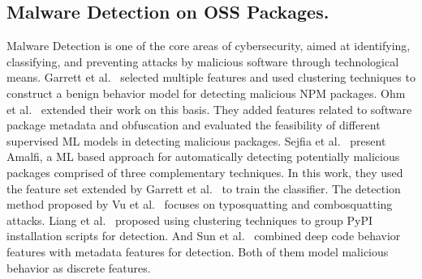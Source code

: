 \subsection{Malware Detection on OSS Packages.} 
Malware Detection is one of the core areas of cybersecurity, aimed at identifying, classifying, and preventing attacks by malicious software through technological means.
Garrett et al.~\cite{garrett2019detecting} selected multiple features and used clustering techniques to construct a benign behavior model for detecting malicious NPM packages.
Ohm et al.~\cite{ohm2022feasibility} extended their work on this basis. They added features related to software package metadata and obfuscation and evaluated the feasibility of different supervised ML models in detecting malicious packages.
Sejfia et al.~\cite{sejfia2022practical} present Amalfi, a ML based approach for automatically detecting potentially malicious packages comprised of three complementary techniques. In this work, they used the feature set extended by Garrett et al.~\cite{garrett2019detecting} to train the classifier. The detection method proposed by Vu et al.~\cite{vu2020typosquatting} focuses on typosquatting and combosquatting attacks. Liang et al.~\cite{liang2023needle} proposed using clustering techniques to group PyPI installation scripts for detection. And Sun et al.~\cite{sun2024integrating} combined deep code behavior features with metadata features for detection. Both of them model malicious behavior as discrete features.

